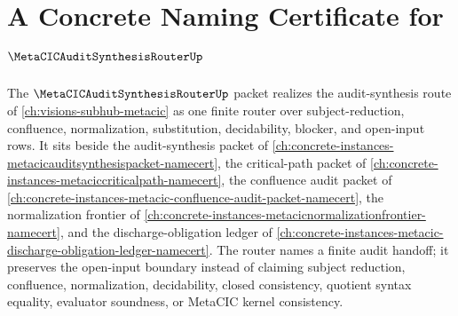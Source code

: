 \chapter{A Concrete Naming Certificate for $\MetaCICAuditSynthesisRouterUp$}
\label{ch:concrete-instances-metacic-audit-synthesis-router-namecert}

The $\MetaCICAuditSynthesisRouterUp$ packet realizes the audit-synthesis route of \autoref{ch:visions-subhub-metacic} as one finite router over subject-reduction, confluence, normalization, substitution, decidability, blocker, and open-input rows. It sits beside the audit-synthesis packet of \autoref{ch:concrete-instances-metacicauditsynthesispacket-namecert}, the critical-path packet of \autoref{ch:concrete-instances-metaciccriticalpath-namecert}, the confluence audit packet of \autoref{ch:concrete-instances-metacic-confluence-audit-packet-namecert}, the normalization frontier of \autoref{ch:concrete-instances-metacicnormalizationfrontier-namecert}, and the discharge-obligation ledger of \autoref{ch:concrete-instances-metacic-discharge-obligation-ledger-namecert}. The router names a finite audit handoff; it preserves the open-input boundary instead of claiming subject reduction, confluence, normalization, decidability, closed consistency, quotient syntax equality, evaluator soundness, or MetaCIC kernel consistency.

